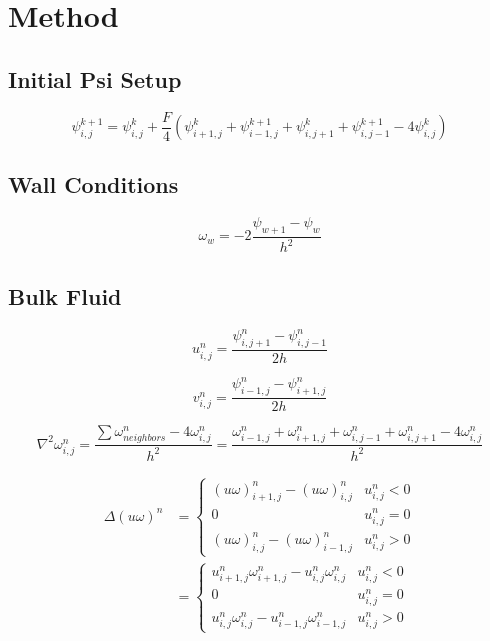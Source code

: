 \section{Method}


\subsection{Initial Psi Setup}
\begin{equation}
    \psi_{i, j}^{k + 1} = \psi_{i, j}^{k} + \frac{F}{4} \left( \psi_{i + 1, j}^{k} + \psi_{i - 1, j}^{k + 1} + \psi_{i, j + 1}^{k} + \psi_{i, j - 1}^{k + 1} - 4 \psi_{i, j}^{k} \right)
\end{equation}

\subsection{Wall Conditions}
\begin{equation}
    \omega_{w} = -2\frac{\psi_{w + 1} - \psi_{w}}{h^2}
\end{equation}


\subsection{Bulk Fluid}
\begin{equation}
    u_{i, j}^{n} = \frac{\psi_{i, j + 1}^{n} - \psi_{i, j - 1}^{n}}{2h}
\end{equation}

\begin{equation}
    v_{i, j}^{n} = \frac{\psi_{i - 1, j}^{n} - \psi_{i + 1, j}^{n}}{2h}
\end{equation}

\begin{equation}
    \nabla^2\omega_{i, j}^{n} = \frac{\sum \omega_{neighbors}^{n} - 4 \omega_{i, j}^{n}}{h^2} = \frac{\omega_{i - 1, j}^{n} + \omega_{i + 1, j}^{n} + \omega_{i, j - 1}^{n} + \omega_{i, j + 1}^{n} - 4 \omega_{i, j}^{n}}{h^2}
\end{equation}


\begin{equation}
    \begin{split}
    \Delta (u \omega)^n  & = \begin{cases} 
          (u\omega)_{i + 1, j}^{n} - (u\omega)_{i, j}^{n} & u_{i, j}^n < 0 \\
          0 & u_{i, j}^n = 0 \\
          (u\omega)_{i, j}^{n} - (u\omega)_{i - 1, j}^{n} & u_{i, j}^n > 0 
       \end{cases} \\
        & = \begin{cases} 
              u_{i + 1, j}^{n}\omega_{i + 1, j}^{n} - u_{i, j}^{n}\omega_{i, j}^{n} & u_{i, j}^n < 0 \\
              0 & u_{i, j}^n = 0 \\
              u_{i, j}^{n}\omega_{i, j}^{n} - u_{i - 1, j}^{n}\omega_{i - 1, j}^{n} & u_{i, j}^n > 0 
           \end{cases}
    \end{split}
\end{equation}



